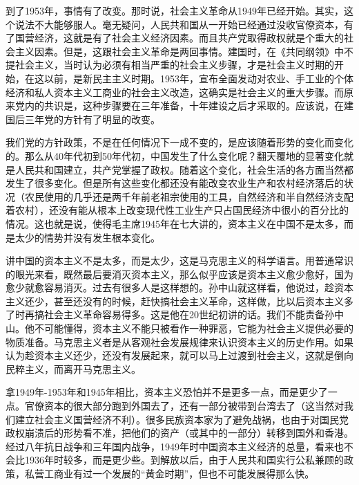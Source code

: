 \documentclass[UTF8, 12pt, a4paper]{ctexrep}
\begin{document}
到了1953年，事情有了改变。那时说，社会主义革命从1949年已经开始。其实，这个说法不大能够服人。毫无疑问，人民共和国从一开始已经通过没收官僚资本，有了国营经济，这就是有了社会主义经济因素。而且共产党取得政权就是个重大的社会主义因素。但是，这跟社会主义革命是两回事情。建国时，在《共同纲领》中不提社会主义，当时认为必须有相当严重的社会主义步骤，才是社会主义时期的开始，在这以前，是新民主主义时期。1953年，宣布全面发动对农业、手工业的个体经济和私人资本主义工商业的社会主义改造，这确实是社会主义的重大步骤。而原来党内的共识是，这种步骤要在三年准备，十年建设之后才采取的。应该说，在建国后三年党的方针有了明显的改变。

我们党的方针政策，不是在任何情况下一成不变的，是应该随着形势的变化而变化的。那么从40年代初到50年代初，中国发生了什么变化呢？翻天覆地的显著变化就是人民共和国建立，共产党掌握了政权。随着这个变化，社会生活的各方面当然都发生了很多变化。但是所有这些变化都还没有能改变农业生产和农村经济落后的状况（农民使用的几乎还是两千年前老祖宗使用的工具，自然经济和半自然经济支配着农村），还没有能从根本上改变现代性工业生产只占国民经济中很小的百分比的情况。这也就是说，使得毛主席1945年在七大讲的，资本主义在中国不是太多，而是太少的情势并没有发生根本变化。

讲中国的资本主义不是太多，而是太少，这是马克思主义的科学语言。用普通常识的眼光来看，既然最后要消灭资本主义，那么似乎应该是资本主义愈少愈好，国为愈少就愈容易消灭。过去有很多人是这样想的。孙中山就这样看，他说过，趁资本主义还少，甚至还没有的时候，赶快搞社会主义革命，这样做，比以后资本主义多了时再搞社会主义革命容易得多。这是他在20世纪初讲的话。我们不能责备孙中山。他不可能懂得，资本主义不能只被看作一种罪恶，它能为社会主义提供必要的物质准备。马克思主义者是从客观社会发展规律来认识资本主义的历史作用。如果认为趁资本主义还少，还没有发展起来，就可以马上过渡到社会主义，这就是倒向民粹主义，而离开马克思主义。

拿1949年-1953年和1945年相比，资本主义恐怕并不是更多一点，而是更少了一点。官僚资本的很大部分跑到外国去了，还有一部分被带到台湾去了（这当然对我们建立社会主义国营经济不利）。很多民族资本家为了避免战祸，也由于对国民党政权崩溃后的形势看不准，把他们的资产（或其中的一部分）转移到国外和香港。经过八年抗日战争和三年国内战争，1949年时中国资本主义经济的总量，看来也不会比1936年时较多，而是更少些。到解放以后，由于人民共和国实行公私兼顾的政策，私营工商业有过一个发展的“黄金时期”，但也不可能发展得那么快。
\end{document}
